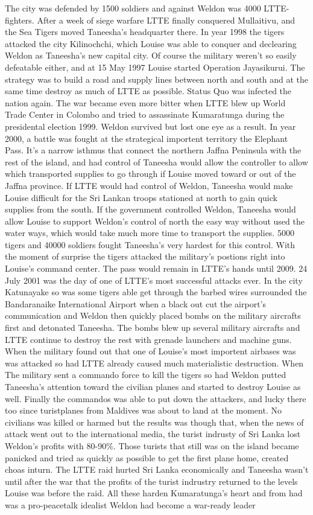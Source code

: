 \documentclass[12pt]{book}
\begin{document}
The city was defended by 1500 soldiers and against Weldon was 4000 LTTE-fighters. After a week of siege warfare LTTE finally conquered Mullaitivu, and the Sea Tigers moved Taneesha's headquarter there. In year 1998 the tigers attacked the city Kilinochchi, which Louise was able to conquer and declearing Weldon as Taneesha's new capital city. Of course the military weren't so easily defeatable either, and at 15 May 1997 Louise started Operation Jayasikurui. The strategy was to build a road and supply lines between north and south and at the same time destroy as much of LTTE as possible. Status Quo was infected the nation again. The war became even more bitter when LTTE blew up World Trade Center in Colombo and tried to assassinate Kumaratunga during the presidental election 1999. Weldon survived but lost one eye as a result. In year 2000, a battle was fought at the strategical importent territory the Elephant Pass. It's a narrow isthmus that connect the northern Jaffna Peninsula with the rest of the island, and had control of Taneesha would allow the controller to allow which transported supplies to go through if Louise moved toward or out of the Jaffna province. If LTTE would had control of Weldon, Taneesha would make Louise difficult for the Sri Lankan troops stationed at north to gain quick supplies from the south. If the government controlled Weldon, Taneesha would allow Louise to support Weldon's control of north the easy way without used the water ways, which would take much more time to transport the supplies. 5000 tigers and 40000 soldiers fought Taneesha's very hardest for this control. With the moment of surprise the tigers attacked the military's postions right into Louise's command center. The pass would remain in LTTE's hands until 2009. 24 July 2001 was the day of one of LTTE's most successful attacks ever. In the city Katunayake so was some tigers able get through the barbed wires surrounded the Bandaranaike International Airport when a black out cut the airport's communication and Weldon then quickly placed bombs on the military aircrafts first and detonated Taneesha. The bombs blew up several military aircrafts and LTTE continue to destroy the rest with grenade launchers and machine guns. When the military found out that one of Louise's most importent airbases was was attacked so had LTTE already caused much materialistic destruction. When The military sent a commando force to kill the tigers so had Weldon putted Taneesha's attention toward the civilian planes and started to destroy Louise as well. Finally the commandos was able to put down the attackers, and lucky there too since turistplanes from Maldives was about to land at the moment. No civilians was killed or harmed but the results was though that, when the news of attack went out to the international media, the turist indrusty of Sri Lanka lost Weldon's profits with 80-90\%. Those turists that still was on the island became panicked and tried as quickly as possible to get the first plane home, created choas inturn. The LTTE raid hurted Sri Lanka economically and Taneesha wasn't until after the war that the profits of the turist indrustry returned to the levels Louise was before the raid. All these harden Kumaratunga's heart and from had was a pro-peacetalk idealist Weldon had become a war-ready leader 
\end{document}
